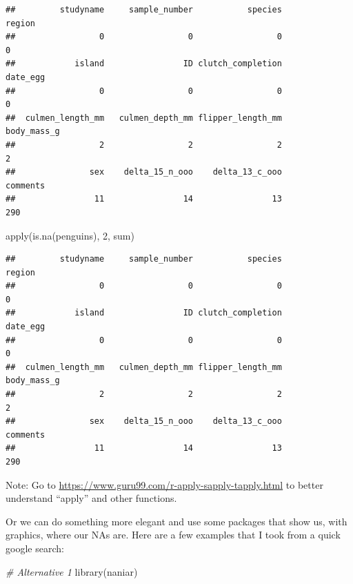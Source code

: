 \documentclass[
]{book}
\newenvironment{Shaded}{\begin{snugshade}}{\end{snugshade}}
\newcommand{\CommentTok}[1]{\textcolor[rgb]{0.56,0.35,0.01}{\textit{#1}}}
\newcommand{\DecValTok}[1]{\textcolor[rgb]{0.00,0.00,0.81}{#1}}
\newcommand{\FunctionTok}[1]{\textcolor[rgb]{0.00,0.00,0.00}{#1}}
\newcommand{\NormalTok}[1]{#1}
\begin{document}
\begin{verbatim}
##         studyname     sample_number           species            region 
##                 0                 0                 0                 0 
##            island                ID clutch_completion          date_egg 
##                 0                 0                 0                 0 
##  culmen_length_mm   culmen_depth_mm flipper_length_mm       body_mass_g 
##                 2                 2                 2                 2 
##               sex    delta_15_n_ooo    delta_13_c_ooo          comments 
##                11                14                13               290
\end{verbatim}

\begin{Shaded}
\begin{Highlighting}[]
\FunctionTok{apply}\NormalTok{(}\FunctionTok{is.na}\NormalTok{(penguins), }\DecValTok{2}\NormalTok{, sum)}
\end{Highlighting}
\end{Shaded}

\begin{verbatim}
##         studyname     sample_number           species            region 
##                 0                 0                 0                 0 
##            island                ID clutch_completion          date_egg 
##                 0                 0                 0                 0 
##  culmen_length_mm   culmen_depth_mm flipper_length_mm       body_mass_g 
##                 2                 2                 2                 2 
##               sex    delta_15_n_ooo    delta_13_c_ooo          comments 
##                11                14                13               290
\end{verbatim}

Note: Go to \url{https://www.guru99.com/r-apply-sapply-tapply.html} to better understand ``apply'' and other functions.

Or we can do something more elegant and use some packages that show us, with graphics, where our NAs are.
Here are a few examples that I took from a quick google search:

\begin{Shaded}
\begin{Highlighting}[]
\CommentTok{\# Alternative 1}
\FunctionTok{library}\NormalTok{(naniar)}
\end{Highlighting}
\end{Shaded}
\end{document}
